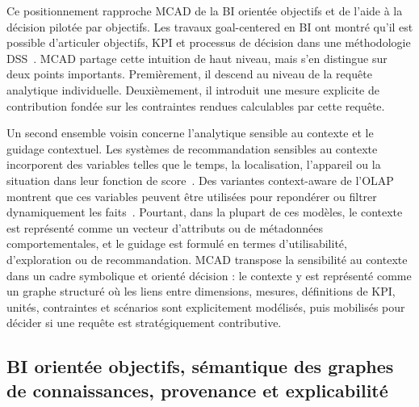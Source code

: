 \documentclass[journal]{IEEEtran}
\begin{document}
Ce positionnement rapproche MCAD de la BI orientée objectifs et de l'aide à la décision pilotée par objectifs. Les travaux goal-centered en BI ont montré qu'il est possible d'articuler objectifs, KPI et processus de décision dans une méthodologie DSS~\cite{Pourshahid2014}. MCAD partage cette intuition de haut niveau, mais s'en distingue sur deux points importants. Premièrement, il descend au niveau de la requête analytique individuelle. Deuxièmement, il introduit une mesure explicite de contribution fondée sur les contraintes rendues calculables par cette requête.

Un second ensemble voisin concerne l'analytique sensible au contexte et le guidage contextuel. Les systèmes de recommandation sensibles au contexte incorporent des variables telles que le temps, la localisation, l'appareil ou la situation dans leur fonction de score~\cite{AdomaviciusTuzhilin2011}. Des variantes context-aware de l'OLAP montrent que ces variables peuvent être utilisées pour repondérer ou filtrer dynamiquement les faits~\cite{RoyContextOLAP2022}. Pourtant, dans la plupart de ces modèles, le contexte est représenté comme un vecteur d'attributs ou de métadonnées comportementales, et le guidage est formulé en termes d'utilisabilité, d'exploration ou de recommandation. MCAD transpose la sensibilité au contexte dans un cadre symbolique et orienté décision : le contexte y est représenté comme un graphe structuré où les liens entre dimensions, mesures, définitions de KPI, unités, contraintes et scénarios sont explicitement modélisés, puis mobilisés pour décider si une requête est stratégiquement contributive.

\subsection{BI orientée objectifs, sémantique des graphes de connaissances, provenance et explicabilité}
\end{document}
